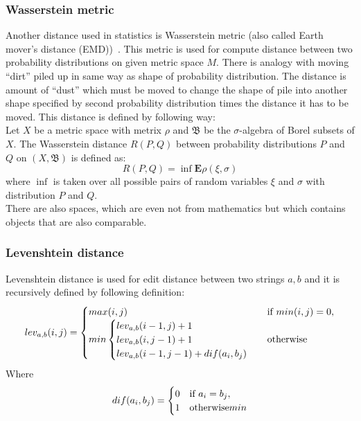 \subsubsection{Wasserstein metric}
Another distance used in statistics is Wasserstein metric (also called Earth mover's distance (EMD))~\cite{Vallender73}. This metric is used for compute distance between two probability distributions on given metric space $M$. There is analogy with moving ``dirt'' piled up in same way as shape of probability distribution. The distance is amount of ``dust'' which must be moved to change the shape of pile into another shape specified by second probability distribution times the distance it has to be moved. This distance is defined by following way:\\
Let $X$ be a metric space with metrix $\rho$ and $\mathfrak{B}$ be the $\sigma$-algebra of Borel subsets of $X$. The Wasserstein distance $R(P,Q)$ between probability distributions $P$ and $Q$ on $(X, \mathfrak{B})$ is defined as:
$$R(P,Q)=\inf\mathbf{E}\rho(\xi, \sigma)$$
where $\inf$ is taken over all possible pairs of random variables $\xi$ and $\sigma$ with distribution $P$ and $Q$.\\

There are also spaces, which are even not from mathematics but which contains objects that are also comparable.

\subsubsection{Levenshtein distance} Levenshtein distance is used for edit distance between two strings $a, b$ and it is recursively defined by following definition:
\begin{equation*}
lev_{a,b}(i,j)=
\begin{cases}
max(i,j) & $if $ min(i,j)=0, \cr
min \begin{cases}
lev_{a,b}(i-1,j) + 1 \cr
lev_{a,b}(i,j-1) + 1 \cr
lev_{a,b}(i-1,j-1) + dif(a_i,b_j)
\end{cases} & $otherwise$
\end{cases}
\end{equation*}
Where \begin{equation*}
dif(a_i,b_j)=
\begin{cases}
0 & $if $ a_i = b_j, \cr
1 & $otherwise$
min 
\end{cases}
\end{equation*}

